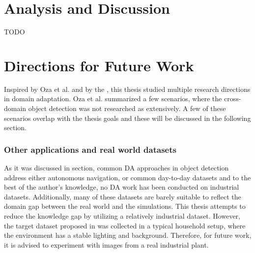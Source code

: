 \documentclass[english, 12pt, a4paper, elec, utf8, a-1b, online]{aaltothesis}
\begin{document}
\clearpage

\section{Analysis and Discussion} 

TODO
\clearpage


\section{Directions for Future Work}
Inspired by Oza et al. \cite{Oza2021} and by the , this thesis studied multiple research directions in domain adaptation. Oza et al. summarized a few scenarios, where the cross-domain object detection was not researched as extensively. A few of these scenarios overlap with the thesis goals and these will be discussed in the following section. 

\subsubsection{Other applications and real world datasets}
As it was discussed in  section, common DA approaches in object detection address either autonomous navigation, or common day-to-day datasets and to the best of the author's knowledge, no DA work has been conducted on  industrial datasets. Additionally, many of these datasets are barely suitable to reflect the domain gap between the real world and the simulations. This thesis attempts to reduce the knowledge gap by utilizing a relatively industrial dataset. However, the target dataset proposed in  was collected in a typical household setup, where the environment has a stable lighting and background. Therefore, for future work, it is advised to experiment with images from a real industrial plant.  
\end{document}
